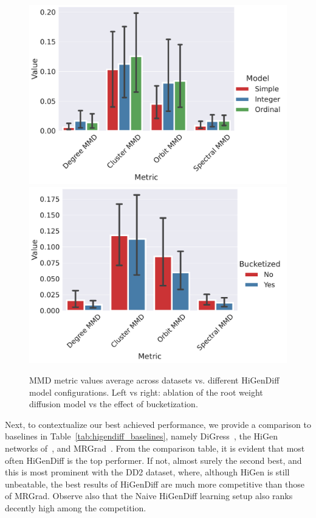 \begin{figure}[H]
    \centering
    \includegraphics[width=0.475\linewidth]{figures/higendiff/ablation_model.pdf}
    \includegraphics[width=0.475\linewidth]{figures/higendiff/ablation_bucketized.pdf}
    \caption[MMD metric values vs. different HiGenDiff model configurations.]{MMD metric values average across datasets vs. different HiGenDiff model configurations. Left vs right: ablation of the root weight diffusion model vs the effect of bucketization.}
    \label{fig:higendiff_ablation}
\end{figure}

Next, to contextualize our best achieved performance, we provide a comparison to baselines in Table~\ref{tab:higendiff_baselines}, namely DiGress~\cite{vignac_digress_2022}, the HiGen networks of~\cite{karami_higen_2024}, and MRGrad~\cite{karami_multi-resolution_2024}. From the comparison table, it is evident that most often HiGenDiff is the top performer. If not, almost surely the second best, and this is most prominent with the DD2 dataset, where, although HiGen is still unbeatable, the best results of HiGenDiff are much more competitive than those of MRGrad. Observe also that the Naive HiGenDiff learning setup also ranks decently high among the competition.

